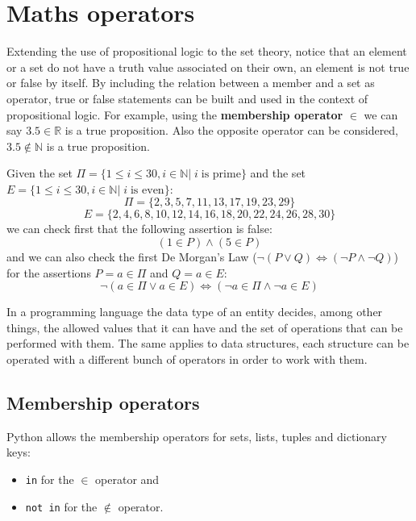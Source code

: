     \newpage
    \section{Maths operators}


Extending the use of propositional logic to the set theory, notice that an element or a set 
do not have a truth value associated on their own, an element is not true or false by itself. 
By including the relation between a member and a set as operator, true or false statements can be 
built and used in the context of propositional logic. 
For example, using the \textbf{membership operator} $\in$ we can say $3.5 \in \mathbb{R}$ is a true proposition. 
Also the opposite operator can be considered, $3.5 \notin \mathbb{N}$ is a true proposition.

Given the set 
$\Pi = \{1\leq i\leq 30, i\in\mathbb{N}|\; i \;\textrm{is prime}\}$ 
and the set 
$E = \{1\leq i\leq 30, i\in\mathbb{N}|\; i \; \textrm{is even}\}$: 
$$
\Pi = \{2, 3, 5, 7, 11, 13, 17, 19, 23, 29\}
$$
$$
E = \{2, 4, 6, 8, 10, 12, 14, 16, 18, 20, 22, 24, 26, 28, 30\}
$$
we can check first that the following assertion is false:
$$
(1\in P) \land (5\in P)
$$
and we can also check the first De Morgan's Law ($\neg (P\lor Q) \iff (\neg P \land \neg Q)$) for the assertions $P = a\in \Pi$ and $Q = a\in E$:
$$
\neg (a\in\Pi \lor a\in E) \iff (\neg a\in\Pi \land \neg a\in E)
$$




In a programming language the data type of an entity decides, among other things, 
the allowed values that it can have and 
the set of operations that can be performed with them.
The same applies to data structures, each structure can be operated 
with a different bunch of operators in order to work with them. 



        
        
        \subsection*{Membership operators}
        \vspace{-0.5cm}
        Python allows the membership operators for sets, lists, tuples and dictionary keys:
        \vspace{-0.7cm}
        \begin{itemize}[noitemsep]
            \item \texttt{in} for the $\in$ operator and
            \item \texttt{not in} for the $\notin$ operator.
        \end{itemize}        
      
